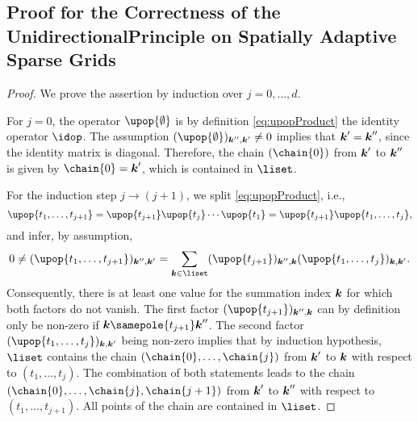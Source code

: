 \printornamentsfalse
\subsection{%
  Proof for the Correctness of the UnidirectionalPrinciple on
  Spatially Adaptive Sparse Grids%
}
\label{sec:proofCorrectnessUnidirectionalPrincipleSASG}
\printornamentstrue

\lemmaChainExistenceSufficient*

\begin{proof}
  We prove the assertion by induction over $j = 0, \dotsc, d$.
  
  For $j = 0$, the operator $\upop{\emptyset}$ is by definition
  \eqref{eq:upopProduct} the identity operator $\idop$.
  The assumption $(\upop{\emptyset})_{\*k'',\*k'} \not= 0$
  implies that ${\boldsymbol{k}}' = {\boldsymbol{k}}''$, since the identity matrix is diagonal.
  Therefore, the chain $(\chain{0})$ from ${\boldsymbol{k}}'$ to ${\boldsymbol{k}}''$ is given by
  $\chain{0} = \*k'$, which is contained in $\liset$.
  
  For the induction step $j \to (j+1)$, we split \cref{eq:upopProduct},
  i.e.,
  \begin{equation}
    \upop{t_1,\dotsc,t_{j+1}}
    = \upop{t_{j+1}} \upop{t_j} \dotsm \upop{t_1}
    = \upop{t_{j+1}} \upop{t_1,\dotsc,t_j},
  \end{equation}
  and infer, by assumption,
  \begin{equation}
    \label{eq:proofLemmaChainExistenceSufficient1}
    0
    \not= (\upop{t_1,\dotsc,t_{j+1}})_{\*k'',\*k'}
    = \sum_{\*k \in \liset} (\upop{t_{j+1}})_{\*k'',\*k}
    (\upop{t_1,\dotsc,t_j})_{\*k,\*k'}.
  \end{equation}
  Consequently,
  there is at least one value for the summation index ${\boldsymbol{k}}$
  for which both factors do not vanish.
  The first factor $(\upop{t_{j+1}})_{\*k'',\*k}$ can by definition
  only be non-zero if $\*k \samepole{t_{j+1}} \*k''$.
  The second factor $(\upop{t_1,\dotsc,t_j})_{\*k,\*k'}$ being
  non-zero implies that by induction hypothesis,
  $\liset$ contains the chain $(\chain{0}, \dotsc, \chain{j})$
  from ${\boldsymbol{k}}'$ to ${\boldsymbol{k}}$ with respect to $(t_1, \dotsc, t_j)$.
  The combination of both statements leads to
  the chain $(\chain{0}, \dotsc, \chain{j}, \chain{j+1})$ from ${\boldsymbol{k}}'$
  to ${\boldsymbol{k}}''$ with respect to $(t_1, \dotsc, t_{j+1})$.
  All points of the chain are contained in $\liset$.
\end{proof}

\lemmaChainExistenceNecessary*

